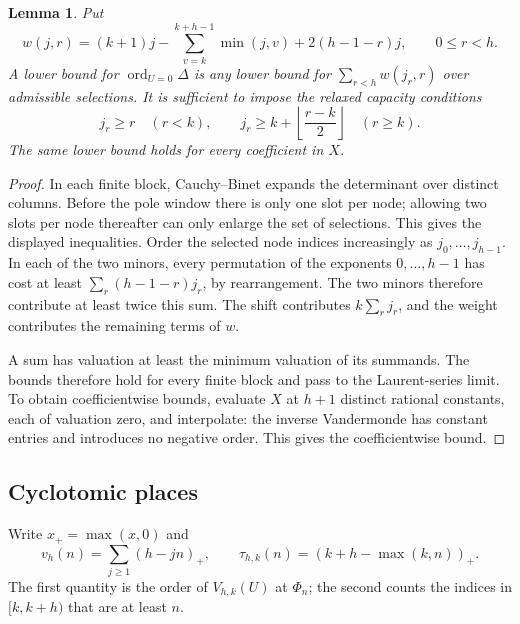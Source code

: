 \documentclass[12pt]{article}
\newtheorem{lemma}[theorem]{Lemma}
\theoremstyle{remark}
\DeclareMathOperator{\ord}{ord}
\begin{document}
\begin{lemma}\label{lem:zero}
Put
\[
w(j,r)=(k+1)j-\sum_{v=k}^{k+h-1}\min(j,v)+2(h-1-r)j,
\qquad 0\leq r<h.
\]
A lower bound for $\ord_{U=0}\Delta$ is any lower bound for $\sum_{r<h}w(j_r,r)$ over admissible selections. It is sufficient to impose the relaxed capacity conditions
\[
j_r\geq r\quad(r<k),\qquad
j_r\geq k+\left\lfloor\frac{r-k}{2}\right\rfloor\quad(r\geq k).
\]
The same lower bound holds for every coefficient in $X$.
\end{lemma}
\begin{proof}
In each finite block, Cauchy--Binet expands the determinant over distinct columns. Before the pole window there is only one slot per node; allowing two slots per node thereafter can only enlarge the set of selections. This gives the displayed inequalities. Order the selected node indices increasingly as $j_0,\ldots,j_{h-1}$. In each of the two minors, every permutation of the exponents $0,\ldots,h-1$ has cost at least $\sum_r(h-1-r)j_r$, by rearrangement. The two minors therefore contribute at least twice this sum. The shift contributes $k\sum_rj_r$, and the weight contributes the remaining terms of $w$.

A sum has valuation at least the minimum valuation of its summands. The bounds therefore hold for every finite block and pass to the Laurent-series limit. To obtain coefficientwise bounds, evaluate $X$ at $h+1$ distinct rational constants, each of valuation zero, and interpolate: the inverse Vandermonde has constant entries and introduces no negative order. This gives the coefficientwise bound.
\end{proof}

\subsection{Cyclotomic places}

Write $x_+=\max(x,0)$ and
\[
v_h(n)=\sum_{j\geq1}(h-jn)_+,\qquad
\tau_{h,k}(n)=(k+h-\max(k,n))_+.
\]
The first quantity is the order of $V_{h,k}(U)$ at $\Phi_n$; the second counts
the indices in $[k,k+h)$ that are at least $n$.
\end{document}
